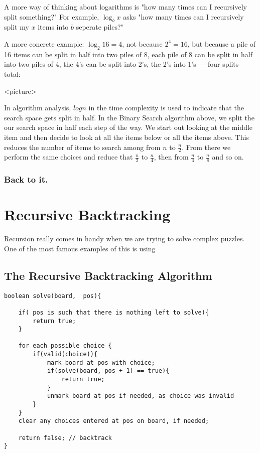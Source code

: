 A more way of thinking about logarithms is "how many times can I recursively split something?"
For example, $\log_b x$ asks "how many times can I recursively split my $x$ items into $b$ seperate piles?"

A more concrete example: $\log_2 16 = 4$, not because $2^4 = 16$, but because a pile of 16 items can be split in half into two piles of 8, each pile of 8 can be split in half into two piles of 4, the 4's can be split into 2's, the 2's into 1's --- four splits total:

<picture>


In algorithm analysis, $log n$ in the time complexity is used to indicate that the search space gets split in half.
In the Binary Search algorithm above, we split the our search space in half each step of the way.  We start out looking at the middle item and then decide to look at all the items below or all the items above.  This reduces the number of items to search among from $n$ to $\frac{n}{2}$.  From there we perform the same choices and reduce that $\frac{n}{2}$ to $\frac{n}{4}$, then from  $\frac{n}{4}$ to  $\frac{n}{8}$ and so on.

\subsubsection{Back to it.}

\section{Recursive Backtracking}
Recursion really comes in handy when we are trying to solve complex puzzles.
One of the most famous examples of this is using

\subsection*{The Recursive Backtracking Algorithm}

\begin{verbatim}
boolean solve(board,  pos){
	
	if( pos is such that there is nothing left to solve){
		return true;
	}
	
	for each possible choice {
		if(valid(choice)){
			mark board at pos with choice;
			if(solve(board, pos + 1) == true){
				return true;
			}
			unmark board at pos if needed, as choice was invalid
		}
	}
	clear any choices entered at pos on board, if needed;
	
	return false; // backtrack
}
	
	
\end{verbatim}


